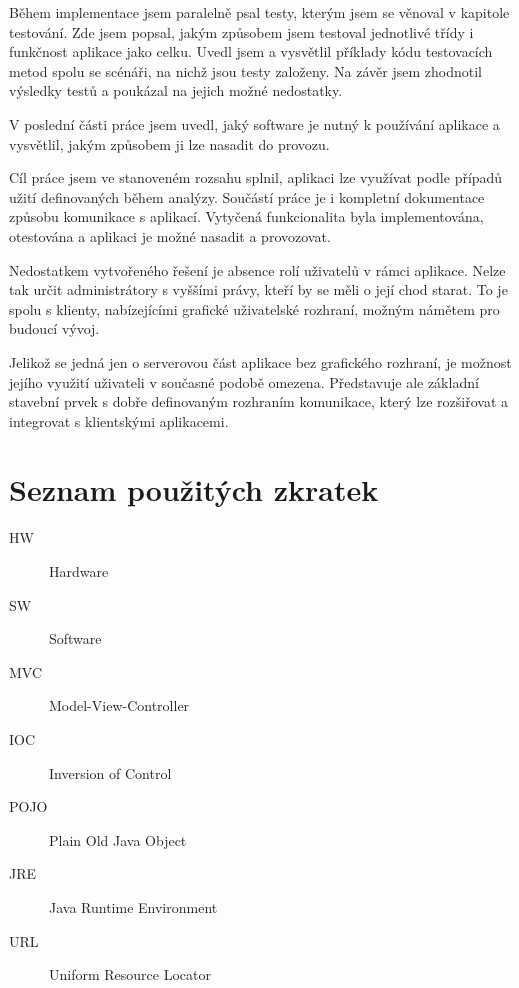 \documentclass[thesis=B,czech]{FITthesis}[2012/06/26]
\begin{document}
\begin{conclusion}
	Během implementace jsem paralelně psal testy, kterým jsem se věnoval v kapitole testování. Zde jsem popsal, jakým způsobem jsem testoval jednotlivé třídy i funkčnost aplikace jako celku. Uvedl jsem a vysvětlil příklady kódu testovacích metod spolu se scénáři, na nichž jsou testy založeny. Na závěr jsem zhodnotil výsledky testů a poukázal na jejich možné nedostatky.
	
	V poslední části práce jsem uvedl, jaký software je nutný k používání aplikace a vysvětlil, jakým způsobem ji lze nasadit do provozu. 
	
	
	Cíl práce jsem ve stanoveném rozsahu splnil, aplikaci lze využívat podle případů užití definovaných během analýzy. Součástí práce je i kompletní dokumentace způsobu komunikace s aplikací. Vytyčená funkcionalita byla implementována, otestována a aplikaci je možné nasadit a provozovat.
	
	Nedostatkem vytvořeného řešení je absence rolí uživatelů v rámci aplikace. Nelze tak určit administrátory s vyššími právy, kteří by se měli o její chod starat. To je spolu s klienty, nabízejícími grafické uživatelské rozhraní, možným námětem pro budoucí vývoj.
	
	Jelikož se jedná jen o serverovou část aplikace bez grafického rozhraní, je možnost jejího využití uživateli v současné podobě omezena. Představuje ale základní stavební prvek s dobře definovaným rozhraním komunikace, který lze rozšiřovat a integrovat s klientskými aplikacemi.
	
	
	 
	 
\end{conclusion}

















\appendix

\chapter{Seznam použitých zkratek}
\begin{description}
	\item[HW] Hardware
	\item[SW] Software
	\item[MVC] Model-View-Controller
	\item[IOC] Inversion of Control
	\item[POJO] Plain Old Java Object
	\item[JRE] Java Runtime Environment
	\item[URL] Uniform Resource Locator
\end{description}
\end{document}
